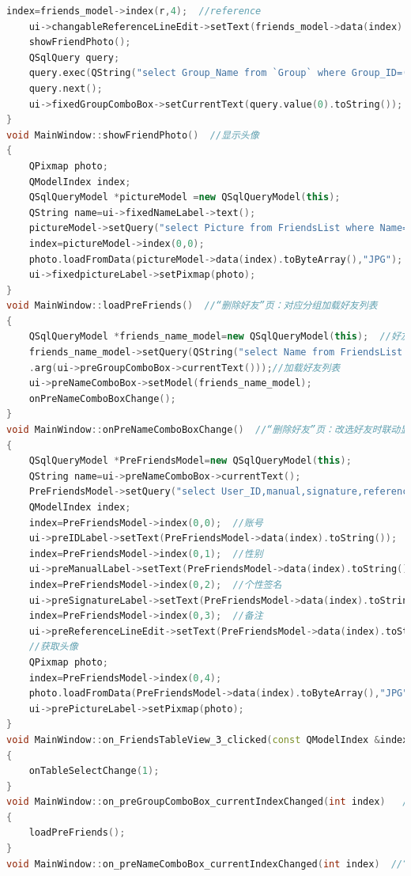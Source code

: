 \documentclass{progartcn}
\begin{document}
\begin{lstlisting}[language=c++]
	index=friends_model->index(r,4);  //reference
	ui->changableReferenceLineEdit->setText(friends_model->data(index).toString());
	showFriendPhoto();
	QSqlQuery query;
	query.exec(QString("select Group_Name from `Group` where Group_ID=(select Group_ID from FriendsList where Name='%1')").arg(ui->fixedNameLabel->text()));
	query.next();
	ui->fixedGroupComboBox->setCurrentText(query.value(0).toString());  //实现分组信息联动
}
void MainWindow::showFriendPhoto()  //显示头像
{
	QPixmap photo;
	QModelIndex index;
	QSqlQueryModel *pictureModel =new QSqlQueryModel(this);
	QString name=ui->fixedNameLabel->text();
	pictureModel->setQuery("select Picture from FriendsList where Name='"+name+"'");
	index=pictureModel->index(0,0);
	photo.loadFromData(pictureModel->data(index).toByteArray(),"JPG");
	ui->fixedpictureLabel->setPixmap(photo);
}
void MainWindow::loadPreFriends()  //“删除好友”页：对应分组加载好友列表
{
	QSqlQueryModel *friends_name_model=new QSqlQueryModel(this);  //好友名称模型数据
	friends_name_model->setQuery(QString("select Name from FriendsList where Group_ID=(select Group_ID from `Group` where Group_Name='%1')")\
	.arg(ui->preGroupComboBox->currentText()));//加载好友列表
	ui->preNameComboBox->setModel(friends_name_model);
	onPreNameComboBoxChange();
}
void MainWindow::onPreNameComboBoxChange()  //“删除好友”页：改选好友时联动显示好友信息
{
	QSqlQueryModel *PreFriendsModel=new QSqlQueryModel(this);
	QString name=ui->preNameComboBox->currentText();
	PreFriendsModel->setQuery("select User_ID,manual,signature,reference,Picture from FriendsList where Name='"+name+"'");
	QModelIndex index;
	index=PreFriendsModel->index(0,0);  //账号
	ui->preIDLabel->setText(PreFriendsModel->data(index).toString());
	index=PreFriendsModel->index(0,1);  //性别
	ui->preManualLabel->setText(PreFriendsModel->data(index).toString());
	index=PreFriendsModel->index(0,2);  //个性签名
	ui->preSignatureLabel->setText(PreFriendsModel->data(index).toString());
	index=PreFriendsModel->index(0,3);  //备注
	ui->preReferenceLineEdit->setText(PreFriendsModel->data(index).toString());
	//获取头像
	QPixmap photo;
	index=PreFriendsModel->index(0,4);
	photo.loadFromData(PreFriendsModel->data(index).toByteArray(),"JPG");
	ui->prePictureLabel->setPixmap(photo);
}
void MainWindow::on_FriendsTableView_3_clicked(const QModelIndex &index)  //“好友信息”页：联动显示好友信息
{
	onTableSelectChange(1);
}
void MainWindow::on_preGroupComboBox_currentIndexChanged(int index)   //“删除好友”页：根据类别对应加载对应好友列表
{
	loadPreFriends();
}
void MainWindow::on_preNameComboBox_currentIndexChanged(int index)  //“删除好友”页：选择好友时联动显示好友信息

\end{lstlisting}
\end{document}
